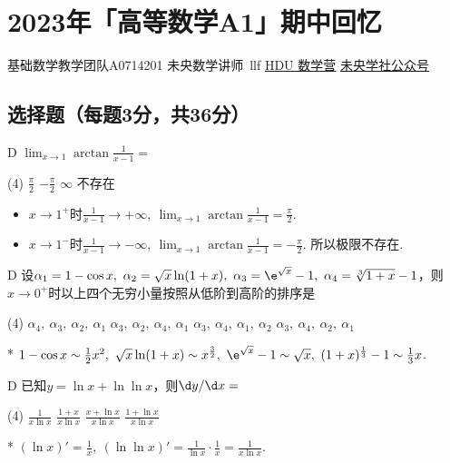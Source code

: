 \chapter{2023年「高等数学A1」期中回忆}

\date{2023年12月2日}{基础数学教学团队}{A0714201}
{未央数学讲师~llf}
{}{\href{https://qm.qq.com/q/OlkSiy9W04}{HDU 数学营}}
{}{\href{http://weixin.qq.com/r/mhKYgFTEMQlOrRDj90eI}{未央学社公众号}}

\section{选择题（每题3分，共36分）}
\begin{choice}{D}
    $\lim_{x\to 1}\arctan\frac{1}{x-1}=$
\begin{tasks}(4)
    \task $\frac\pi2$
    \task $-\frac\pi2$
    \task $\infty$
    \task 不存在
\end{tasks}
\end{choice}
\begin{solution}
\begin{itemize}
    \item $x\to 1^+$时$\frac{1}{x-1}\to +\infty,\ \lim_{x\to 1}\arctan\frac{1}{x-1}=\frac\pi2$.
    \item $x\to 1^-$时$\frac{1}{x-1}\to -\infty,\ \lim_{x\to 1}\arctan\frac{1}{x-1}=-\frac\pi2$. 所以极限不存在. 
\end{itemize}
\end{solution}

\begin{choice}{D}
    设$\alpha_1=1-\cos x,\ \alpha_2=\sqrt x\ln(1+x),\ \alpha_3=\e^{\sqrt x}-1,\ \alpha_4=\sqrt[3]{1+x}-1$，则$x\to 0^+$时以上四个无穷小量按照从低阶到高阶的排序是
\begin{tasks}(4)
    \task $\alpha_4,\ \alpha_3,\ \alpha_2,\ \alpha_1$
    \task $\alpha_3,\ \alpha_2,\ \alpha_4,\ \alpha_1$
    \task $\alpha_3,\ \alpha_4,\ \alpha_1,\ \alpha_2$
    \task $\alpha_3,\ \alpha_4,\ \alpha_2,\ \alpha_1$
\end{tasks}
\end{choice}
\begin{solution}*
    $1-\cos x\sim\frac12x^2,\ \sqrt x\ln(1+x)\sim x^{\frac32},\ \e^{\sqrt x}-1\sim\sqrt x,\ (1+x)^{\frac13}-1\sim\frac13 x$. 
\end{solution}

\begin{choice}{D}
    已知$y=\ln x+\ln\ln x$，则$\d y/\d x=$
\begin{tasks}(4)
    \task $\frac{1}{x\ln x}$
    \task $\frac{1+x}{x\ln x}$
    \task $\frac{x+\ln x}{x\ln x}$
    \task $\frac{1+\ln x}{x\ln x}$
\end{tasks}
\end{choice}
\begin{solution}*
    $(\ln x)'=\frac1x,\ (\ln\ln x)'=\frac{1}{\ln x}\cdot\frac1x=\frac{1}{x\ln x}$. 
\end{solution}

